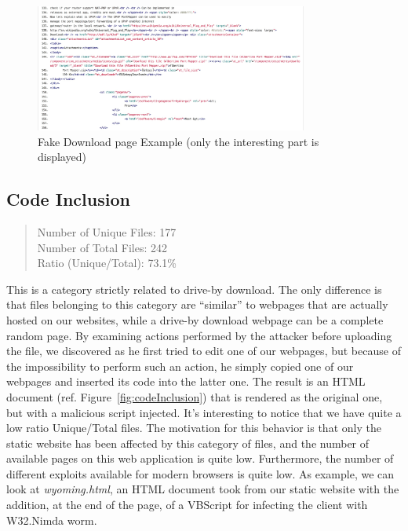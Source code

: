 \begin{figure}[H]
\centerline{\includegraphics[width=0.8\textwidth]{Images/fakeDownload.jpg}}
\caption{Fake Download page Example (only the interesting part is displayed)\label{fig:fakeDownload}}
\end{figure}

\subsection{Code Inclusion}

\begin{quote}
Number of Unique Files: 177\\
Number of Total Files: 242\\
Ratio (Unique/Total): 73.1\%
\end{quote}

This is a category strictly related to drive-by download. The only difference is that files belonging to this category are ``similar'' to webpages that are actually hosted on our websites, while a drive-by download webpage can be a complete random page. By examining actions performed by the attacker before uploading the file, we discovered as he first tried to edit one of our webpages, but because of the impossibility to perform such an action, he simply copied one of our webpages and inserted its code into the latter one. The result is an HTML document (ref. Figure~\ref{fig:codeInclusion}) that is rendered as the original one, but with a malicious script injected. It's interesting to notice that we have quite a low ratio Unique/Total files. The motivation for this behavior is that only the static website has been affected by this category of files, and the number of available pages on this web application is quite low. Furthermore, the number of different exploits available for modern browsers is quite low.
As example, we can look at \emph{wyoming.html}, an HTML document took from our static website with the addition, at the end of the page, of a VBScript for infecting the client with W32.Nimda worm.

